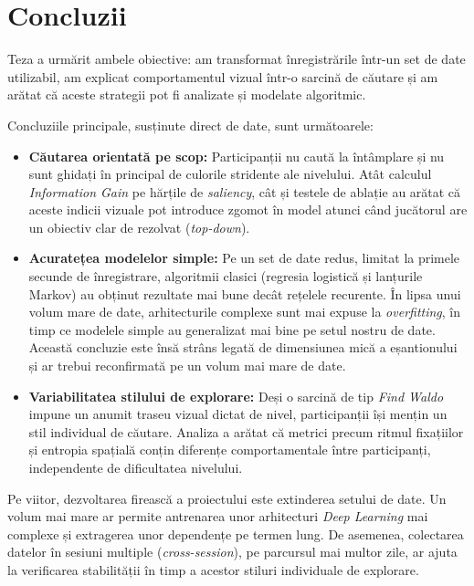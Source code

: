 \section{Concluzii}

Teza a urmărit ambele obiective: am transformat înregistrările într-un set de date utilizabil, am explicat comportamentul vizual într-o sarcină de căutare și am arătat că aceste strategii pot fi analizate și modelate algoritmic.

Concluziile principale, susținute direct de date, sunt următoarele:
\begin{itemize}
	\item \textbf{Căutarea orientată pe scop:} Participanții nu caută la întâmplare și nu sunt ghidați în principal de culorile stridente ale nivelului. Atât calculul \emph{Information Gain} pe hărțile de \emph{saliency}, cât și testele de ablație au arătat că aceste indicii vizuale pot introduce zgomot în model atunci când jucătorul are un obiectiv clar de rezolvat (\emph{top-down}).
	\item \textbf{Acuratețea modelelor simple:} Pe un set de date redus, limitat la primele secunde de înregistrare, algoritmii clasici (regresia logistică și lanțurile Markov) au obținut rezultate mai bune decât rețelele recurente. În lipsa unui volum mare de date, arhitecturile complexe sunt mai expuse la \emph{overfitting}, în timp ce modelele simple au generalizat mai bine pe setul nostru de date. Această concluzie este însă strâns legată de dimensiunea mică a eșantionului și ar trebui reconfirmată pe un volum mai mare de date.
	\item \textbf{Variabilitatea stilului de explorare:} Deși o sarcină de tip \emph{Find Waldo} impune un anumit traseu vizual dictat de nivel, participanții își mențin un stil individual de căutare. Analiza a arătat că metrici precum ritmul fixațiilor și entropia spațială conțin diferențe comportamentale între participanți, independente de dificultatea nivelului.
\end{itemize}

Pe viitor, dezvoltarea firească a proiectului este extinderea setului de date. Un volum mai mare ar permite antrenarea unor arhitecturi \emph{Deep Learning} mai complexe și extragerea unor dependențe pe termen lung. De asemenea, colectarea datelor în sesiuni multiple (\emph{cross-session}), pe parcursul mai multor zile, ar ajuta la verificarea stabilității în timp a acestor stiluri individuale de explorare.
